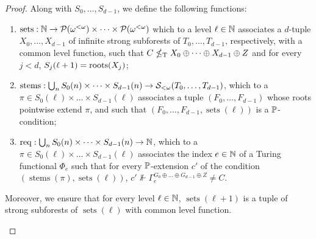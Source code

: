 \begin{proof}
Along with $S_0, \dots, S_{d-1}$, we define the following functions:
\begin{enumerate}
	\item $\operatorname{sets}: \mathbb{N} \to \mathcal{P}({\omega^{<\omega}}) \times \dots \times \mathcal{P}({\omega^{<\omega}})$ which to a level $\ell \in \mathbb{N}$
	associates a $d$-tuple $X_0, \dots, X_{d-1}$ of infinite strong subforests of $T_0, \dots, T_{d-1}$, respectively, with a common level function, such that $C \nleq_{\text{\upshape T}} X_0 \oplus \dots \oplus X_{d-1} \oplus Z$ and for every $j < d$, $S_j(\ell+1) = \operatorname{roots}(X_j)$;
	\item $\operatorname{stems}: \bigcup_n {S}_0(n) \times \dots \times {S}_{d-1}(n) \to \mathcal{S}_{<\omega}({T_0, \dots, T_{d-1}})$, which to a $\pi \in S_0(\ell) \times \dots \times S_{d-1}(\ell)$ associates a tuple $(F_0, \dots, F_{d-1})$ whose roots pointwise extend $\pi$, and such that $(F_0, \dots, F_{d-1}, \operatorname{sets}(\ell))$ is a $\mathbb{P}$-condition;
	\item $\operatorname{req}: \bigcup_n {S}_0(n) \times \dots \times {S}_{d-1}(n) \to \mathbb{N}$, which to a $\pi \in S_0(\ell) \times \dots \times S_{d-1}(\ell)$ associates the index $e \in \mathbb{N}$ of a Turing functional $\Phi_e$
	such that for every $\mathbb{P}$-extension $c'$ of the condition $(\operatorname{stems}(\pi), \operatorname{sets}(\ell))$,
	$c' \nVdash \Gamma_e^{G_0 \oplus \dots \oplus G_{d-1} \oplus Z} \neq C$.
\end{enumerate}
Moreover, we ensure that for every level $\ell \in \mathbb{N}$,
$\operatorname{sets}(\ell+1)$ is a tuple of strong subforests of $\operatorname{sets}(\ell)$ with common level function.
\begin{figure}[h!]
  \begin{center}
\end{center}
\end{figure}
\end{proof}
